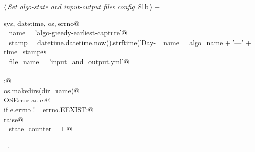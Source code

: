 \documentclass[11.5pt]{report}
\begin{document}
\begin{flushleft} \small\label{scrap128}\raggedright\small
{} $\langle\,${\itshape Set algo-state and input-output files config}\nobreak\ {\footnotesize {81b}}$\,\rangle\equiv$
\vspace{-1ex}
\begin{list}{}{} \item
\mbox{}\verb@import sys, datetime, os, errno@\\
\mbox{}\verb@algo_name     = 'algo-greedy-earliest-capture'@\\
\mbox{}\verb@time_stamp    = datetime.datetime.now().strftime('Day-%Y-%m-%d_ClockTime-%H:%M:%S')@\\
\mbox{}\verb@dir_name      = algo_name + '---' + time_stamp@\\
\mbox{}\verb@io_file_name  = 'input_and_output.yml'@\\
\mbox{}\verb@@\\
\mbox{}\verb@try:@\\
\mbox{}\verb@    os.makedirs(dir_name)@\\
\mbox{}\verb@except OSError as e:@\\
\mbox{}\verb@    if e.errno != errno.EEXIST:@\\
\mbox{}\verb@        raise@\\
\mbox{}\verb@algo_state_counter = 1 @\\
\mbox{}\verb@@{\NWsep}
\end{list}
\vspace{-1.5ex}
\footnotesize
\begin{list}{}{\setlength{\itemsep}{-\parsep}\setlength{\itemindent}{-\leftmargin}}
\item \NWtxtMacroRefIn\ .

\item{}
\end{list}
\vspace{4ex}
\end{flushleft}
\end{document}
